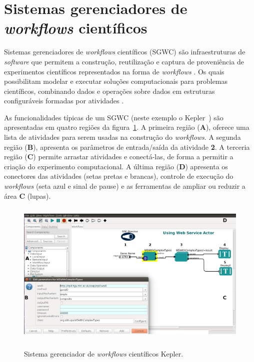 \section{Sistemas gerenciadores de \emph{workf\mbox{}lows} científ\mbox{}icos}\label{SEC_SISTEMA_GERENCIADOR_WORKFLOW}
Sistemas gerenciadores de \emph{workflows} científicos (SGWC) são infraestruturas de \emph{software} que permitem a construção, reutilização e captura de proveniência de experimentos científicos representados na forma de \emph{workflows} \cite{McPhillips2009}. Os quais possibilitam modelar e executar soluções computacionais para problemas científicos, combinando dados e operações sobre dados em estruturas configuráveis formadas por atividades \cite{Garijo2014}.

As funcionalidades típicas de um SGWC (neste exemplo o Kepler~\cite{kepler2014}) são apresentadas em quatro regiões da figura~\ref{figura_SGWC_Kepler_exemplo_de_workflow}. A primeira região (\textbf{A}), oferece uma lista de atividades para serem usadas na construção do \emph{workf\mbox{}lows}. A segunda região (\textbf{B}), apresenta os parâmetros de entrada/saída da atividade \textbf{2}. A terceria região (\textbf{C}) permite arrastar atividades e conectá-las, de forma a permitir a criação do experimento computacional. A última região (\textbf{D}) apresenta os conectores das atividades (setas pretas e brancas), controle de execução do \emph{workflows} (seta azul e sinal de pause) e as ferramentas de ampliar ou reduzir a área \textbf{C} (lupas).
\begin{figure}[!hbt]
    \centering  
    \caption[Sistema gerenciador de \emph{workf\mbox{}low} científ\mbox{}ico Kepler]{Sistema gerenciador de \emph{workf\mbox{}lows} científ\mbox{}icos Kepler.}
    \includegraphics[width=13cm,height=7cm]{./secoes/conceitosFundamentais/pics/img/webService.png}    
	\label{figura_SGWC_Kepler_exemplo_de_workflow}
\end{figure}

